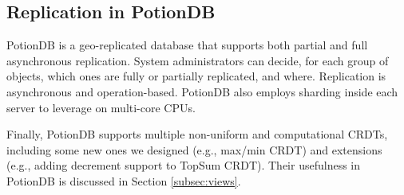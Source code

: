 \subsection{Replication in PotionDB}

PotionDB is a geo-replicated database that supports both partial and full asynchronous replication.
System administrators can decide, for each group of objects, which ones are fully or partially replicated, and where.
Replication is asynchronous and operation-based.
PotionDB also employs sharding inside each server to leverage on multi-core CPUs.

Finally, PotionDB supports multiple non-uniform and computational CRDTs, including some new ones we designed (e.g., max/min CRDT) and extensions (e.g., adding decrement support to TopSum CRDT).
Their usefulness in PotionDB is discussed in Section \ref{subsec:views}.



 






